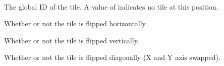\documentclass[letterpaper,10pt,english]{sphinxmanual}
\begin{document}
\begin{fulllineitems}
\label{index:tmx.LayerTile}~

\begin{fulllineitems}
\label{index:tmx.LayerTile.gid}
The global ID of the tile.  A value of  indicates no tile at
this position.

\end{fulllineitems}


\begin{fulllineitems}
\label{index:tmx.LayerTile.hflip}
Whether or not the tile is flipped horizontally.

\end{fulllineitems}


\begin{fulllineitems}
\label{index:tmx.LayerTile.vflip}
Whether or not the tile is flipped vertically.

\end{fulllineitems}


\begin{fulllineitems}
\label{index:tmx.LayerTile.dflip}
Whether or not the tile is flipped diagonally (X and Y axis
swapped).

\end{fulllineitems}


\end{fulllineitems}

\end{document}
